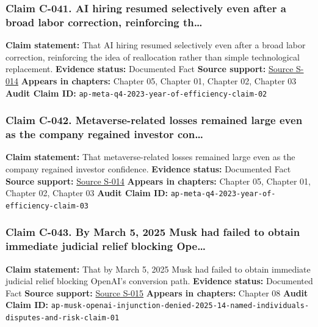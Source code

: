 \documentclass[
  american,
  11pt,
  letterpaper,
]{article}
\begin{document}
\subsubsection{Claim C-041. AI hiring resumed selectively even after a
broad labor correction, reinforcing
th\ldots{}}\label{claim-c-041-ai-hiring-resumed-selectively-even-after-a-broad-labor-correction-reinforcing-th}

\textbf{Claim statement:} That AI hiring resumed selectively even after
a broad labor correction, reinforcing the idea of reallocation rather
than simple technological replacement. \textbf{Evidence status:}
Documented Fact \textbf{Source support:}
\hyperref[source-s-014-meta-posts-sharp-profit-revenue-increase-in-q4-thanks-to-cost-cuts-and-advertising-rebound]{Source
S-014} \textbf{Appears in chapters:} Chapter 05, Chapter 01, Chapter 02,
Chapter 03 \textbf{Audit Claim ID:}
\texttt{ap-meta-q4-2023-year-of-efficiency-claim-02}

\subsubsection{Claim C-042. Metaverse-related losses remained large even
as the company regained investor
con\ldots{}}\label{claim-c-042-metaverse-related-losses-remained-large-even-as-the-company-regained-investor-con}

\textbf{Claim statement:} That metaverse-related losses remained large
even as the company regained investor confidence. \textbf{Evidence
status:} Documented Fact \textbf{Source support:}
\hyperref[source-s-014-meta-posts-sharp-profit-revenue-increase-in-q4-thanks-to-cost-cuts-and-advertising-rebound]{Source
S-014} \textbf{Appears in chapters:} Chapter 05, Chapter 01, Chapter 02,
Chapter 03 \textbf{Audit Claim ID:}
\texttt{ap-meta-q4-2023-year-of-efficiency-claim-03}

\subsubsection{Claim C-043. By March 5, 2025 Musk had failed to obtain
immediate judicial relief blocking
Ope\ldots{}}\label{claim-c-043-by-march-5-2025-musk-had-failed-to-obtain-immediate-judicial-relief-blocking-ope}

\textbf{Claim statement:} That by March 5, 2025 Musk had failed to
obtain immediate judicial relief blocking OpenAI's conversion path.
\textbf{Evidence status:} Documented Fact \textbf{Source support:}
\hyperref[source-s-015-judge-denies-elon-musk-s-request-to-block-openai-for-profit-conversion-but-welcomes-trial]{Source
S-015} \textbf{Appears in chapters:} Chapter 08 \textbf{Audit Claim ID:}
\texttt{ap-musk-openai-injunction-denied-2025-14-named-individuals-disputes-and-risk-claim-01}
\end{document}
